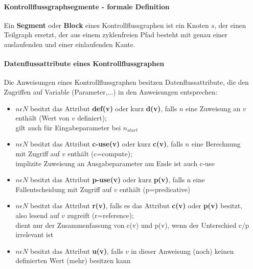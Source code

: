 \paragraph{Kontrollflussgraphsegmente - formale Definition}
Ein \textbf{Segment} oder \textbf{Block} eines Kontrollflussgraphen ist ein Knoten $s$, der einen Teilgraph ersetzt, der aus einem zyklenfreien Pfad besteht mit genau einer auslaufenden und einer einlaufenden Kante.

\paragraph{Datenflussattribute eines Kontrollflussgraphen}
Die Anweisungen eines Kontrollflussgraphen besitzen Datenflussattribute, die den Zugriffen auf Variable (Parameter,...) in den Anweisungen entsprechen:
\begin{itemize}
	\item $n \epsilon N$ besitzt das Attribut \textbf{def(v)} oder kurz \textbf{d(v)}, falls $n$ eine Zuweisung an $v$ enthält (Wert von $v$ definiert); \\
	gilt auch für Eingabeparameter bei $n_{start}$
	\item $n \epsilon N$ besitzt das Attribut \textbf{c-use(v)} oder kurz \textbf{c(v)}, falls $n$ eine Berechnung mit Zugriff auf $v$ enthält (c=compute); \\
	implizite Zuweisung an Ausgabeparameter am Ende ist auch c-use
	\item $n \epsilon N$ besitzt das Attribut \textbf{p-use(v)} oder kurz \textbf{p(v)}, falls n eine Fallentscheidung mit Zugriff auf $v$ enthält (p=predicative)
	\item $n \epsilon N$ besitzt das Attribut \textbf{r(v)}, falls es das Attribut \textbf{c(v)} oder \textbf{p(v)} besitzt, also lesend auf $v$ zugreift (r=reference); \\
	dient nur der Zusammenfassung von c(v) und p(v), wenn der Unterschied c/p irrelevant ist
	\item $n \epsilon N$ besitzt das Attribut \textbf{u(v)}, falls $v$ in dieser Anweisung (noch) keinen definierten Wert (mehr) besitzen kann
\end{itemize}

